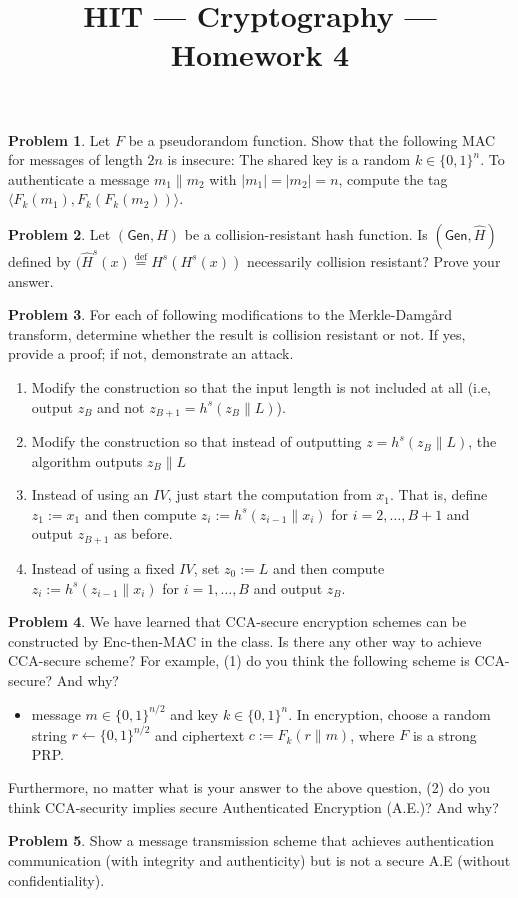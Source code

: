 \documentclass[11pt]{article}
\title{HIT --- Cryptography --- Homework 4}
\theoremstyle{definition}
\providecommand{\abs}[1]{\lvert#1\rvert}
\newtheorem{problem}{Problem}
\begin{document}
\maketitle

\begin{problem}
Let $F$ be a pseudorandom function. Show that the following MAC for messages of length $2n$ is insecure: The shared key is a random $k\in \{0,1\}^n$. To authenticate a message $m_1\| m_2$ with $\abs{m_1} =\abs{m_2} = n$, compute the tag $\langle F_k(m_1), F_k(F_k(m_2))\rangle$. 
\end{problem}

\begin{problem}
Let $(\mathsf{Gen},H)$ be a collision-resistant hash function. Is $(\mathsf{Gen},\hat{H})$ defined by $(\hat{H}^s(x) \overset{\text{def}}{=} H^s(H^s(x))$ necessarily collision resistant? Prove your answer. 
\end{problem}

\begin{problem}
For each of following modifications to the Merkle-Damg\r{a}rd transform, determine whether the result is collision resistant or not. If yes, provide a proof; if not, demonstrate an attack.
\begin{enumerate}
\item Modify the construction so that the input length is not included at all (i.e, output $z_B$ and not $z_{B+1} = h^s(z_B\| L)$).
\item Modify the construction so that instead of outputting $z = h^s(z_B\| L)$, the algorithm outputs $z_B\|L$
\item Instead of using an $IV$, just start the computation from $x_1$. That is, define $z_1 := x_1$ and then compute $z_i := h^s(z_{i-1}\|x_i)$ for $i=2,\dotsc,B+1$ and output $z_{B+1}$ as before.
\item Instead of using a fixed $IV$, set $z_0 := L$ and then compute $z_i := h^s(z_{i-1}\|x_i)$ for $i=1,\dotsc,B$ and output $z_B$.
\end{enumerate}
\end{problem}
\begin{problem}
We have learned that CCA-secure encryption schemes can be constructed by Enc-then-MAC in the class. Is there any other way to achieve CCA-secure scheme? For example, (1) do you think the following scheme is CCA-secure? And why?
\begin{itemize}
\item message $m \in \{0,1 \}^{n/2}$ and key $k \in \{0,1 \}^{n}$. In encryption, choose a random string $r \gets \{0,1 \}^{n/2}$ and ciphertext $c := F_{k}(r\| m)$, where $F$ is a strong PRP.
\end{itemize}
Furthermore, no matter what is your answer to the above question, (2) do you think CCA-security implies secure Authenticated Encryption (A.E.)? And why?
\end{problem}
\begin{problem}
Show a message transmission scheme that achieves authentication communication (with integrity and authenticity) but is not a secure A.E (without confidentiality).
\end{problem}
\end{document}
